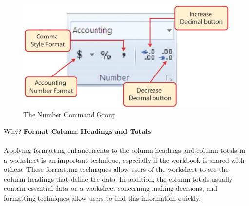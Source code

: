 \begin{figure}[H]
	\centering
	\includegraphics[width=\maxwidth{.95\linewidth}]{gfx/ch01_fig35}
	\caption{The Number Command Group}
	\label{01:fig35}
\end{figure}

\begin{center}
	\begin{infobox}{Why?}
		\textbf{Format Column Headings and Totals}
		\\
		\\
		Applying formatting enhancements to the column headings and column totals in a worksheet is an important technique, especially if the workbook is shared with others. These formatting techniques allow users of the worksheet to see the column headings that define the data. In addition, the column totals usually contain essential data on a worksheet concerning making decisions, and formatting techniques allow users to find this information quickly.
	\end{infobox}
\end{center}

